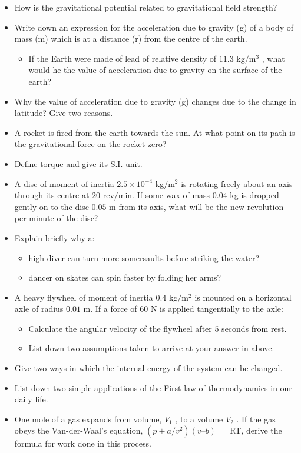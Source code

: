 \documentclass{article}
\begin{document}
\begin{itemize}
\item How is the gravitational potential related to gravitational field strength?
\item Write down an expression for the acceleration due to gravity (g) of a body of mass (m) which is at a  distance (r) from the centre of the earth. 
 \begin{itemize}
\item If the Earth were made of lead of relative density of $ 11.3$ kg$/$m$ ^{3}$ , what would he the value of acceleration due to gravity on the surface of the earth?
\end{itemize}
\item Why the value of acceleration due to gravity (g) changes due to the change in latitude? Give two reasons.
\item A rocket is fired from the earth towards the sun. At what point on its path is the gravitational force on the rocket zero?
\item Define torque and give its S.I. unit.
\item A disc of moment of inertia $ 2.5\times10^{-4}$ kg$/$m$ ^{2}$ is rotating freely about an axis through its centre at $ 20$ rev/min. If some wax of mass $ 0.04$ kg is dropped gently on to the disc $ 0.05$ m from its axis, what will be the new revolution per minute of the disc? 
\item Explain briefly why a:
 \begin{itemize}
\item high diver can turn more somersaults before striking the water?
\item dancer on skates can spin faster by folding her arms?
\end{itemize}
\item A heavy flywheel of moment of inertia $ 0.4$ kg$/$m$ ^{2}$ is mounted on a horizontal axle of radius $ 0.01$ m. If a force of $ 60$ N is applied tangentially to the axle:
 \begin{itemize}
\item  Calculate the angular velocity of the flywheel after $ 5$ seconds from rest.
\item List down two assumptions taken to arrive at your answer in above.
\end{itemize}
\item Give two ways in which the internal energy of the system can be changed.
\item List down two simple applications of the First law of thermodynamics in our daily life.
\item One mole of a gas expands from volume, $ V_{1}$ , to a volume $ V_{2}$ . If the gas obeys the Van-der-Waal’s equation, $ (p+ a/v^{2})(v – b)=$ RT, derive the formula for work done in this process.

\end{itemize}
\end{document}
